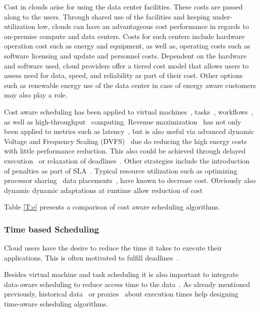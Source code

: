 \documentclass[final,5p,times,twocolumn]{elsarticle}
\begin{document}
Cost in clouds arise for using the data center facilities. These costs
are passed along to the users. Through shared use of the facilities
and keeping under-utilization low, clouds can have an advantageous
cost performance in regards to on-premise compute and data
centers. Costs for such centers include hardware operation cost such
as energy and equipment, as well as, operating costs such as software
licensing and update and personnel costs. Dependent on the hardware
and software used, cloud providers offer a tiered cost model that
allows users to assess need for data, speed, and reliability as part
of their cost.  Other options such as renewable energy use of the data
center in case of energy aware customers may also play a role.

Cost aware scheduling has been applied to virtual
machines~\cite{yuan2017ttsa},
tasks~\cite{yuan2017temporal,zuo2015multi},
workflows~\cite{arabnejad2015cost,arabnejad2016budget}, as well as
high-throughput~\cite{yuan2016cawsac} computing.  Revenue
maximization~\cite{yuan2018warm} has not only been applied to metrics
such as latency~\cite{ghahramani2017toward}, but is also useful via
advanced dynamic Voltage and Frequency Scaling
(DVFS)~\cite{las10cloudsched,calheiros2014energy} due do reducing the
high energy costs with little performance reduction. This also could
be achieved through delayed execution~\cite{bi2016trs} or relaxation
of deadlines~\cite{zhang2018dynamic}.  Other strategies include the
introduction of penalties as part of SLA~\cite{wu2012sla}. Typical
resource utilization such as optimizing processor
sharing~\cite{lee2012profit} data placements~\cite{lee2012profit},
have known to decrease cost. Obviously also dynamic dynamic
adaptations at runtime allow reduction of cost~\cite{ari2013design}

Table \ref{T:e} presents a comparison of cost aware scheduling algorithms.





\subsubsection{Time based Scheduling}\label{sec:time}



Cloud users have the desire to reduce the time it takes to execute
their applications. This is often motivated to fulfill
deadlines~\cite{arabnejad2017scheduling}.

Besides virtual machine and task scheduling it is also important to
integrate data-aware scheduling to reduce access time to the
data~\cite{van2013online}. As already mentioned previously, historical
data~\cite{thomas2015credit} or proxies~ \cite{erdil2013autonomic}
about execution times help designing time-aware scheduling algorithms.
\end{document}
